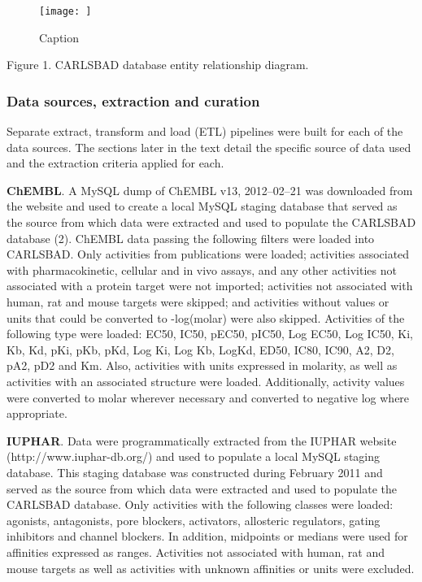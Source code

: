 \begin{figure}
    \centering
    \texttt{[image: ]}
    \caption{Caption}
    \label{fig:my_label}
\end{figure}
Figure 1.
CARLSBAD database entity relationship diagram.

\subsubsection{Data sources, extraction and curation}

Separate extract, transform and load (ETL) pipelines were built for each of the data sources. The sections later in the text detail the specific source of data used and the extraction criteria applied for each.

\textbf{ChEMBL}. A MySQL dump of ChEMBL v13, 2012–02–21 was downloaded from the website and used to create a local MySQL staging database that served as the source from which data were extracted and used to populate the CARLSBAD database (2). ChEMBL data passing the following filters were loaded into CARLSBAD. Only activities from publications were loaded; activities associated with pharmacokinetic, cellular and in vivo assays, and any other activities not associated with a protein target were not imported; activities not associated with human, rat and mouse targets were skipped; and activities without values or units that could be converted to -log(molar) were also skipped. Activities of the following type were loaded: EC50, IC50, pEC50, pIC50, Log EC50, Log IC50, Ki, Kb, Kd, pKi, pKb, pKd, Log Ki, Log Kb, LogKd, ED50, IC80, IC90, A2, D2, pA2, pD2 and Km. Also, activities with units expressed in molarity, as well as activities with an associated structure were loaded. Additionally, activity values were converted to molar wherever necessary and converted to negative log where appropriate.

\textbf{IUPHAR}. Data were programmatically extracted from the IUPHAR website (http://www.iuphar-db.org/) and used to populate a local MySQL staging database. This staging database was constructed during February 2011 and served as the source from which data were extracted and used to populate the CARLSBAD database. Only activities with the following classes were loaded: agonists, antagonists, pore blockers, activators, allosteric regulators, gating inhibitors and channel blockers. In addition, midpoints or medians were used for affinities expressed as ranges. Activities not associated with human, rat and mouse targets as well as activities with unknown affinities or units were excluded.

